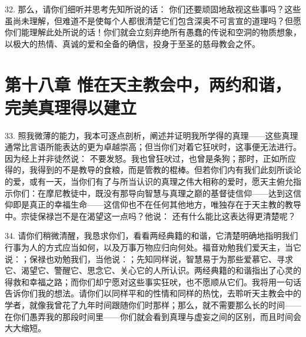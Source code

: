 32. 那么，请你们细听并思考先知所说的话： 你们还要顽固地敌视这些事吗？这些虽尚未理解，但难道不是使每个人都很清楚它们包含深奥不可言宣的道理吗？但愿你们能理解此处所说的话！你们就会立刻弃绝所有愚蠢的传说和空洞的物质想象，以极大的热情、真诚的爱和全备的确信，投身于至圣的慈母教会之怀。\par


\section{第十八章  惟在天主教会中，两约和谐，完美真理得以建立}

33. 照我微薄的能力，我本可逐点剖析，阐述并证明我所学得的真理——这些真理通常比言语所能表达的更为卓越崇高；但当你们对着它狂吠时，这事便无法进行。因为经上并非徒然说： 不要发怒。我也曾狂吠过，也曾是条狗；那时，正如所应得的，我得到的不是教导的食粮，而是管教的棍棒。但若你们内有我们此刻所谈论的爱，或有一天，当你们有了与所当认识的真理之伟大相称的爱时，愿天主俯允指示你们：在摩尼教徒中，既没有那导向智慧与真理之巅的基督徒信仰——达到这信仰即是真正的幸福生命——这信仰也不在任何其他地方，唯独存在于天主教的教导中。宗徒保禄岂不是在渴望这一点吗？他说： 还有什么能比这表达得更清楚呢？\par

34. 请你们稍微清醒，我恳求你们，看看两经典籍的和谐，它清楚明确地指明我们行事为人的方式应当如何，以及万事万物应归向何处。福音劝勉我们爱天主，当它说：；保禄也劝勉我们，当他说：；先知同样说，智慧易于为那些爱慕它、寻求它、渴望它、警醒它、思念它、关心它的人所认识。两经典籍的和谐指出了心灵的得救和幸福之路；而你们却宁愿对这些事实狂吠，也不愿顺从它们。我将用一句话告诉你们我的想法。请你们以同样平和的性情和同样的热忱，去聆听天主教会中的学者，就像我曾花了九年时间跟随你们时那样；那么，就不需要那么长的时间——在你们愚弄我的那段时间里——你们就会看到真理与虚妄之间的区别，而且时间会大大缩短。\par

